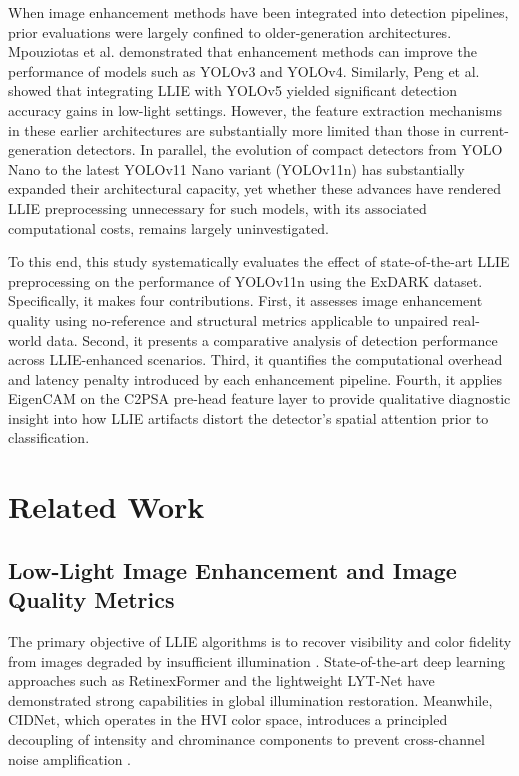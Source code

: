 \documentclass[conference]{IEEEtran}
\begin{document}
When image enhancement methods have been integrated into detection pipelines, prior evaluations were largely confined to older-generation architectures. Mpouziotas et al. \cite{mpouziotas2022lowlight} demonstrated that enhancement methods can improve the performance of models such as YOLOv3 and YOLOv4. Similarly, Peng et al. \cite{peng2024yolov5llie} showed that integrating LLIE with YOLOv5 yielded significant detection accuracy gains in low-light settings. However, the feature extraction mechanisms in these earlier architectures are substantially more limited than those in current-generation detectors. In parallel, the evolution of compact detectors from YOLO Nano \cite{wong2019yolonano} to the latest YOLOv11 Nano variant (YOLOv11n) \cite{khanam2024yolov11} has substantially expanded their architectural capacity, yet whether these advances have rendered LLIE preprocessing unnecessary for such models, with its associated computational costs, remains largely uninvestigated.

To this end, this study systematically evaluates the effect of state-of-the-art LLIE preprocessing on the performance of YOLOv11n using the ExDARK dataset. Specifically, it makes four contributions. First, it assesses image enhancement quality using no-reference and structural metrics applicable to unpaired real-world data. Second, it presents a comparative analysis of detection performance across LLIE-enhanced scenarios. Third, it quantifies the computational overhead and latency penalty introduced by each enhancement pipeline. Fourth, it applies EigenCAM on the C2PSA pre-head feature layer to provide qualitative diagnostic insight into how LLIE artifacts distort the detector's spatial attention prior to classification.




\section{Related Work}
\subsection{Low-Light Image Enhancement and Image Quality Metrics}
The primary objective of LLIE algorithms is to recover visibility and color fidelity from images degraded by insufficient illumination \cite{liu2021benchmark}. State-of-the-art deep learning approaches such as RetinexFormer \cite{cai2023retinexformer} and the lightweight LYT-Net \cite{brateanu2025lytnet} have demonstrated strong capabilities in global illumination restoration. Meanwhile, CIDNet, which operates in the HVI color space, introduces a principled decoupling of intensity and chrominance components to prevent cross-channel noise amplification \cite{yan2025hvi}.
\end{document}
